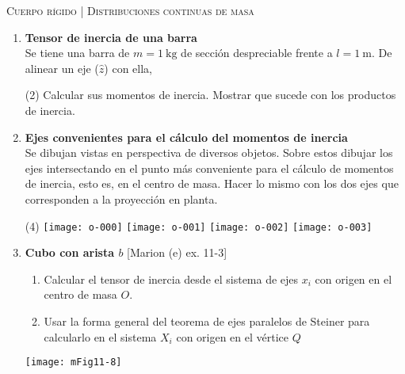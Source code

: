 \documentclass[11pt, spanish, a4paper, twoside]{article}
\begin{document}
\begin{center}
  \textsc{\large Cuerpo rígido | Distribuciones continuas de masa}
\end{center}


\begin{enumerate}
	\item
	\textbf{Tensor de inercia de una barra}\\
	Se tiene una barra de \(m= \SI{1}{\kilo\gram}\) de sección despreciable frente a \(l= \SI{1}{\metre}\).
	De alinear un eje (\(\hat{z}\)) con ella, 
	\begin{tasks}(2)
		\task	Calcular sus momentos de inercia.
		\task Mostrar que sucede con los productos de inercia. 
	\end{tasks}


	\item
	\textbf{Ejes convenientes para el cálculo del momentos de inercia}\\
	Se dibujan vistas en perspectiva de diversos objetos.
	Sobre estos dibujar los ejes intersectando en el punto más conveniente para el cálculo de momentos de inercia, esto es, en el centro de masa.
	Hacer lo mismo con los dos ejes que corresponden a la proyección en planta.
	\vspace{-0.8cm}
	\begin{tasks}(4)
		\task \texttt{[image: o-000]}
		\task \texttt{[image: o-001]}
		\task \texttt{[image: o-002]}
		\task \texttt{[image: o-003]}
	\end{tasks}


	\item 
	\begin{minipage}[t][4.5cm]{0.55\textwidth}
			\textbf{Cubo con arista \(b\)} [Marion (e) ex. 11-3]
			\begin{enumerate}
				\item Calcular el tensor de inercia desde el sistema de ejes \(x_i\) con origen en el centro de masa \(O\).
				\item Usar la forma general del teorema de ejes paralelos de Steiner para calcularlo en el sistema \(X_i\) con origen en el vértice \(Q\) 
			\end{enumerate}
		\end{minipage}
		\begin{minipage}[c][1cm][t]{0.4\textwidth}
			\texttt{[image: mFig11-8]}
		\end{minipage}



\end{enumerate}
\end{document}
